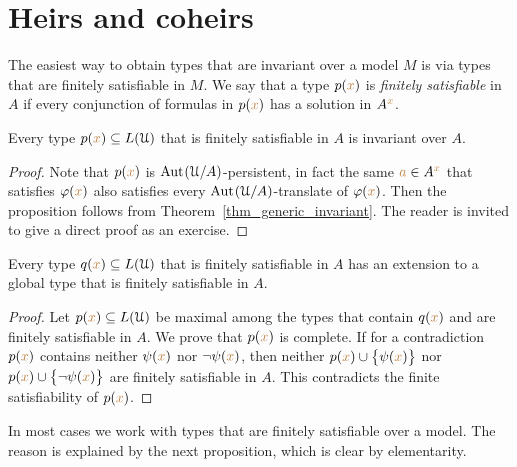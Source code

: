 \section{Heirs and coheirs}
\label{coheirs}

\def\medrel#1{\parbox[t]{6ex}{$\displaystyle\hfil #1$}}
\def\ceq#1#2#3{\parbox[t]{16ex}{$\displaystyle #1$}\medrel{#2}{$\displaystyle #3$}}

The easiest way to obtain types that are invariant over a model $M$ is via types that are finitely satisfiable in $M$.
We say that a type $p({\color{brown} x})$ is \emph{finitely satisfiable\/} in $A$ if every conjunction of formulas in $p({\color{brown} x})$ has a solution in $A^{\color{brown} x}$.

\begin{proposition}\label{prop_coeredi_quasiinvarienti}
  Every type $p({\color{brown} x})\subseteq L(\EuScript U)$ that is finitely satisfiable in $A$ is invariant over $A$.
\end{proposition}

\begin{proof}
  Note that $p({\color{brown} x})$ is ${\rm Aut\kern.15ex}(\EuScript U/A)$-persistent, in fact the same ${\color{brown} a}\in A^{\color{brown} x}$ that satisfies $\varphi({\color{brown} x})$ also satisfies every ${\rm Aut\kern.15ex}(\EuScript U/A)$-translate of $\varphi({\color{brown} x})$.
  Then the proposition follows from Theorem~\ref{thm_generic_invariant}. 
    The reader is invited to give a direct proof as an exercise.
\end{proof}

\begin{proposition}\label{prop_exisntence_coheirs}
  Every type $q({\color{brown} x})\subseteq L(\EuScript U)$ that is finitely satisfiable in $A$ has an extension to a global type that is finitely satisfiable in $A$.
\end{proposition}

\begin{proof}
  Let $p({\color{brown} x})\subseteq L(\EuScript U)$ be maximal among the types that contain $q({\color{brown} x})$ and are finitely satisfiable in $A$.
  We prove that $p({\color{brown} x})$ is complete.
  If for a contradiction $p({\color{brown} x})$ contains neither $\psi({\color{brown} x})$ nor $\neg\psi({\color{brown} x})$, then  neither $p({\color{brown} x})\cup\big\{\psi({\color{brown} x})\big\}$ nor $p({\color{brown} x})\cup\big\{\neg\psi({\color{brown} x})\big\}$ are finitely satisfiable in $A$.
  This contradicts the finite satisfiability of $p({\color{brown} x})$.
\end{proof}

In most cases we work with types that are finitely satisfiable over a model.
The reason is explained by the next proposition, which is clear by elementarity.

